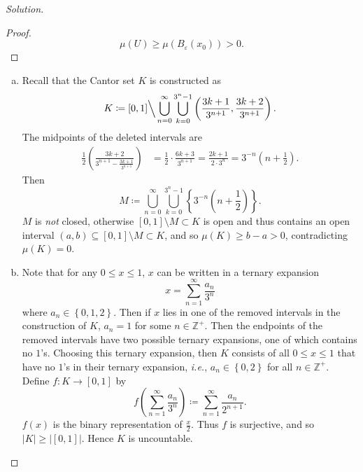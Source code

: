 \documentclass[12pt]{article}
\newcommand{\z}{\mathbb{Z}}
\newcommand{\ita}[1]{\textit{#1}}
\newcommand\paren[1]{\left( #1 \right)}
\newcommand\setb[1]{\left \{ #1 \right \}}
\newcommand{\eps}{\varepsilon}
\theoremstyle{definition}
\begin{document}
\begin{proof}[Solution]
\begin{proof}
\[            \mu(U) \geq \mu \paren{ B_{\eps}(x_0) } > 0.
        \]
    \end{proof}
    \begin{enumerate}[(a)]
        \item Recall that the Cantor set $K$ is constructed as \[
            K \coloneqq [0,1]  \Big\backslash \bigcup\limits_{n = 0}^{\infty} \bigcup\limits_{k = 0}^{3^n - 1} \paren{ \frac{3k+1}{3^{n+1}} , \frac{3k+2}{3^{n+1}} }.
        \]
        The midpoints of the deleted intervals are 
        \begin{align*}
            \frac{1}{2} \paren{ \frac{3k+2}{3^{n+1} - \frac{3k+1}{3^{n+1}}} } & = \frac{1}{2} \cdot \frac{6k+3}{3^{n+1}} = \frac{2k+1}{2\cdot 3^n} = 3^{-n} \paren{ n + \frac{1}{2} }.
        \end{align*}
        Then 
        \[
            M \coloneqq \bigcup\limits_{n = 0}^{\infty} \bigcup\limits_{k = 0}^{3^n - 1} \setb{ 3^{-n} \paren{ n + \frac{1}{2} } }.
        \]
        $M$ is \ita{not} closed, otherwise $[0,1] \setminus M \subset K$ is open and thus contains an open interval $(a,b) \subseteq [0,1] \setminus M \subset K$, and so $\mu(K) \geq b-a > 0$, contradicting $\mu(K) = 0$.
        \item Note that for any $0 \leq x \leq 1$, $x$ can be written in a ternary expansion 
        \[
            x = \sum\limits_{n = 1}^{\infty} \frac{a_n}{3^n}
        \]
        where $a_n \in \setb{ 0 , 1 , 2 }$. Then if $x$ lies in one of the removed intervals in the construction of $K$, $a_n = 1$ for some $n \in \z^+$. Then the endpoints of the removed intervals have two possible ternary expansions, one of which contains no $1$'s. Choosing this ternary expansion, then $K$ consists of all $0 \leq x \leq 1$ that have no $1$'s in their ternary expansion, \ita{i.e.}, $a_n \in \setb{ 0 , 2 } $ for all $n \in \z^+$. Define $f : K \to [0,1]$ by 
        \[
            f \paren{ \sum\limits_{n = 1}^{\infty} \frac{a_n}{3^n} } \coloneqq \sum\limits_{n = 1}^{\infty} \frac{a_n}{2^{n+1}}.
        \]
        $f(x)$ is the binary representation of $\frac{x}{2}$. Thus $f$ is surjective, and so $|K| \geq |[0,1]|$. Hence $K$ is uncountable.
    \end{enumerate}
\end{proof}
\end{document}
